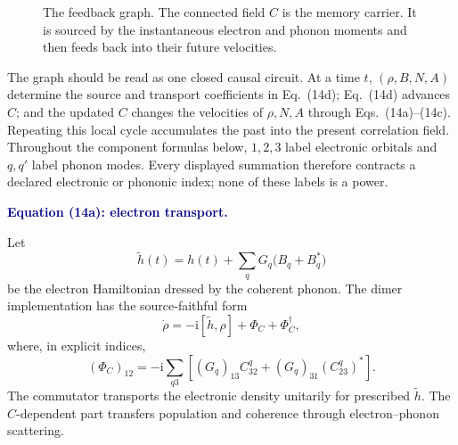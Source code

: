 \documentclass[10pt]{article}
\newcommand{\ii}{\mathrm i}
\newcommand{\flowlead}[1]{%
  \par\medskip
  \needspace{3\baselineskip}%
  \noindent\textcolor{navy}{\textbf{#1.}}\enspace\ignorespaces
}
\begin{document}
\begin{figure}[t]
\centering
{}
\caption{The feedback graph.  The connected field \(C\) is the memory carrier.
It is sourced by the instantaneous electron and phonon moments and then feeds
back into their future velocities.}
\label{fig:feedback}
\end{figure}

The graph should be read as one closed causal circuit.  At a time \(t\),
\((\rho,B,N,A)\) determine the source and transport coefficients in
Eq.~(14d); Eq.~(14d) advances \(C\); and the updated \(C\) changes the
velocities of \(\rho,N,A\) through Eqs.~(14a)--(14c).  Repeating this local
cycle accumulates the past into the present correlation field.  Throughout
the component formulas below, \(1,2,3\) label electronic orbitals and
\(q,q'\) label phonon modes.  Every displayed summation therefore contracts a
declared electronic or phononic index; none of these labels is a power.

\flowlead{Equation (14a): electron transport}

Let
\[
\widetilde h(t)
=h(t)+\sum_q G_q\bigl(B_q+B_q^\ast\bigr)
\]
be the electron Hamiltonian dressed by the coherent phonon.  The dimer
implementation has the source-faithful form
\[
\dot\rho
=-\ii[\widetilde h,\rho]
+\Phi_C+\Phi_C^\dagger,
\tag{14a$'$}
\]
where, in explicit indices,
\[
(\Phi_C)_{12}
=-\ii\sum_{q3}
\left[
(G_q)_{13}C^q_{32}
+(G_q)_{31}(C^q_{23})^\ast
\right].
\]
The commutator transports the electronic density unitarily for prescribed
\(\widetilde h\).  The \(C\)-dependent part transfers population and coherence
through electron--phonon scattering.
\end{document}
